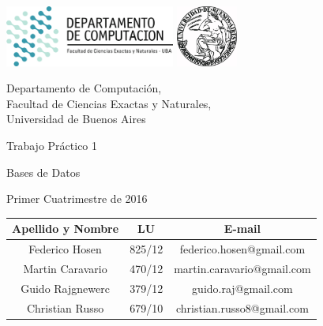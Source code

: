\documentclass[a4paper, 10pt, twoside]{article}
\newcommand{\titulo}{Trabajo Práctico 1}
\newcommand{\materia}{Bases de Datos}
\newcommand{\cuatrimestre}{Primer Cuatrimestre de 2016}
\begin{document}


\thispagestyle{caratula}

\begin{center}

\includegraphics[height=2cm]{DC.png} 
\hfill
\includegraphics[height=2cm]{UBA.jpg} 

\vspace{2cm}

Departamento de Computación,\\
Facultad de Ciencias Exactas y Naturales,\\
Universidad de Buenos Aires

\vspace{4cm}

\begin{Huge}
\titulo
\end{Huge}

\vspace{0.5cm}

\begin{Large}
\materia
\end{Large}

\vspace{1cm}

\cuatrimestre

\vspace{4cm}

\begin{tabular}{|c|c|c|}
\hline
Apellido y Nombre & LU & E-mail\\
\hline
Federico Hosen  & 825/12 & federico.hosen@gmail.com\\
Martin Caravario  & 470/12 & martin.caravario@gmail.com\\
Guido Rajgnewerc  & 379/12 & guido.raj@gmail.com\\
Christian Russo  & 679/10 & christian.russo8@gmail.com\\
\hline
\end{tabular}

\end{center}
\end{document}

